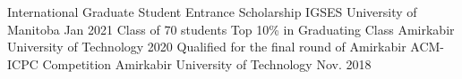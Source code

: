 \documentclass[11pt, a4paper]{awesome-cv}
\begin{document}
\begin{cventries}
	\cventry
	{International Graduate Student Entrance Scholarship} %
	{IGSES} %
	{University of Manitoba} %
	{Jan 2021} %
	{	}
	\cventry
	{Class of 70 students} %
	{Top 10\% in Graduating Class} %
	{Amirkabir University of Technology} %
	{2020} %
	{	}
	\cventry
	{} %
	{Qualified for the final round of Amirkabir ACM-ICPC Competition} %
	{Amirkabir University of Technology} %
	{Nov. 2018} %
	{	}
	
\end{cventries}


\end{document}
